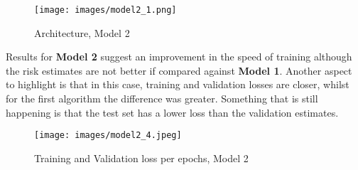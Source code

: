 \documentclass[11pt]{article}
\begin{document}
\begin{table}[H]
    \begin{center}
    \caption{Hyperparameters, Model 2} \label{tab:hyper_model2}

    \end{center}
\end{table}


\begin{figure}[H]
    \centering
    \texttt{[image: images/model2\_1.png]}
    \caption{Architecture, Model 2}
    \label{fig:architecture_model2}
\end{figure}

Results for \textbf{Model 2} suggest an improvement in the speed of training although the risk estimates are not better if compared against \textbf{Model 1}. Another aspect to highlight is that in this case, training and validation losses are closer, whilst for the first algorithm the difference was greater. Something that is still happening is that the test set has a lower loss than the validation estimates.\\

\begin{figure}[H]
    \centering
    \texttt{[image: images/model2\_4.jpeg]}
    \caption{Training and Validation loss per epochs, Model 2}
    \label{fig:model2_results}
\end{figure}
\end{document}
